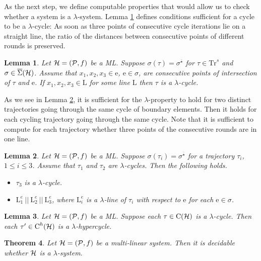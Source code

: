 \documentclass[copyright,creativecommons]{packages/eptcs}
\newcommand{ \lin}{\mbox{L}}
\newcommand{\ml}{\mbox{ML}}
\newcommand{\traj}{\tau}
\newcommand{\Cycle}{\mbox{C}}
\newcommand{\seq}{\overline{\star}}
\newcommand{\sgn}{\Sigma}
\newcommand{\ssgn}{\overline{\sgn}}
\newcommand{\Trj}{\mbox{Tr}}
\newcommand{\Hc}{\Cycle^h}
\newcommand{\be}{\mbox{e}}
\newtheorem{theorem}{Theorem}[section]
\newtheorem{lemma}[theorem]{Lemma}
\begin{document}
As the next step, we  define computable properties that would allow us to check whether a system is a $\lambda$-system.
Lemma \ref{prop:traj} defines conditions sufficient for a cycle to be a  $\lambda$-cycle:  As soon as three points of consecutive  cycle iterations  lie on a straight line, the ratio of the distances between  consecutive points of different rounds is preserved. 

\begin{lemma}\label{prop:traj} Let ${\cal{H}}=({\cal P},f)$ be a  \ml. Suppose $\sigma(\traj)=\sigma^{\seq}$ for $\traj\in\Trj^s$ and  $\sigma\in\ssgn(\cal H)$. Assume that $x_1,x_2,x_3\in\be$,  $\be\in\sigma$,  are consecutive points of intersection of $\traj$ and $\be$. If $x_1,x_2,x_3\in\lin$ for some line $\lin$ then  $\traj$ is a $\lambda$-cycle. 
\end{lemma}



As we see in Lemma \ref{lem:lambda-prop}, it is sufficient  for the $\lambda$-property to hold for two distinct trajectories going through the same  cycle of boundary elements.  Then it holds for each cycling trajectory
going through the same cycle. Note that it is sufficient to compute for each trajectory whether three points of the consecutive rounds are in one line.


\begin{lemma}\label{lem:lambda-prop} Let ${\cal{H}}=({\cal P},f)$ be a \ml. Suppose $\sigma(\traj_i)=\sigma^{\seq}$ for a trajectory $\traj_i$, $1\leq i\leq 3$.
Assume that  $\traj_1$ and $\traj_2$ are $\lambda$-cycles. Then the following holds.
\begin{itemize}
 \item $\traj_3$ is a $\lambda$-cycle. 
\item $\lin^e_1~||~\lin^e_2~||~\lin^e_3$, where $\lin^e_i$ is a  $\lambda$-line of $\traj_i$ with respect to $\be$ for each $\be\in\sigma$. 
\end{itemize} 
\end{lemma}

\begin{lemma}\label{lemma:lambda_hypercycle} Let ${\cal{H}}=({\cal P},f)$ be a \ml.  Suppose  each $\tau\in\Cycle(\cal H)$  is a $\lambda$-cycle. Then each $\tau'\in\Hc(\cal H)$  is a $\lambda$-hypercycle. 
\end{lemma}

\begin{theorem}\label{theorem:criterion} Let ${\cal{H}}=({\cal P},f)$ be a multi-linear system. Then  it is decidable whether ${\cal{H}}$ is a $\lambda$-system.
\end{theorem}
\end{document}
